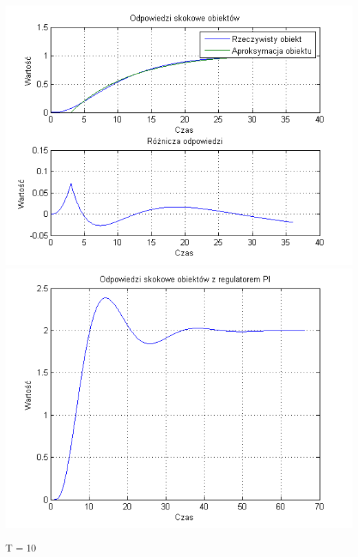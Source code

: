 \documentclass[10pt,a4paper]{article}
\begin{document}
\begin{center}
\includegraphics[scale=1]{images/jeden/skrypt_101.png}\\
\includegraphics[scale=1]{images/jeden/skrypt_102.png}\\
\end{center}
\newpage
T = 10
\end{document}
